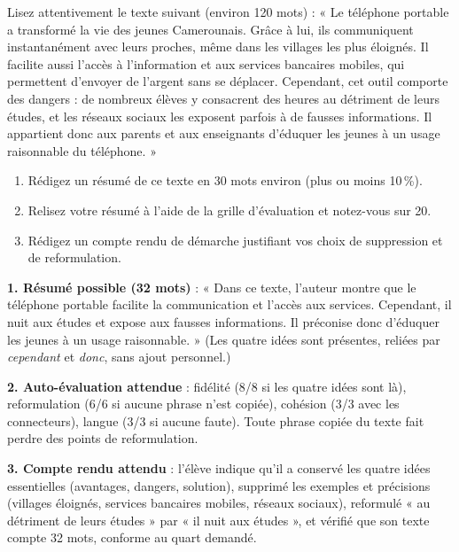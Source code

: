 \documentclass[11pt]{article}
\begin{document}
\begin{exercice}
Lisez attentivement le texte suivant (environ 120 mots) : « Le téléphone portable a transformé la vie des jeunes Camerounais. Grâce à lui, ils communiquent instantanément avec leurs proches, même dans les villages les plus éloignés. Il facilite aussi l'accès à l'information et aux services bancaires mobiles, qui permettent d'envoyer de l'argent sans se déplacer. Cependant, cet outil comporte des dangers : de nombreux élèves y consacrent des heures au détriment de leurs études, et les réseaux sociaux les exposent parfois à de fausses informations. Il appartient donc aux parents et aux enseignants d'éduquer les jeunes à un usage raisonnable du téléphone. »

\begin{enumerate}
\item Rédigez un résumé de ce texte en 30 mots environ (plus ou moins 10\,\%).
\item Relisez votre résumé à l'aide de la grille d'évaluation et notez-vous sur 20.
\item Rédigez un compte rendu de démarche justifiant vos choix de suppression et de reformulation.
\end{enumerate}
\end{exercice}

\begin{corrige}
\textbf{1. Résumé possible (32 mots)} : « Dans ce texte, l'auteur montre que le téléphone portable facilite la communication et l'accès aux services. Cependant, il nuit aux études et expose aux fausses informations. Il préconise donc d'éduquer les jeunes à un usage raisonnable. » (Les quatre idées sont présentes, reliées par \emph{cependant} et \emph{donc}, sans ajout personnel.)

\textbf{2. Auto-évaluation attendue} : fidélité (8/8 si les quatre idées sont là), reformulation (6/6 si aucune phrase n'est copiée), cohésion (3/3 avec les connecteurs), langue (3/3 si aucune faute). Toute phrase copiée du texte fait perdre des points de reformulation.

\textbf{3. Compte rendu attendu} : l'élève indique qu'il a conservé les quatre idées essentielles (avantages, dangers, solution), supprimé les exemples et précisions (villages éloignés, services bancaires mobiles, réseaux sociaux), reformulé « au détriment de leurs études » par « il nuit aux études », et vérifié que son texte compte 32 mots, conforme au quart demandé.
\end{corrige}
\end{document}
